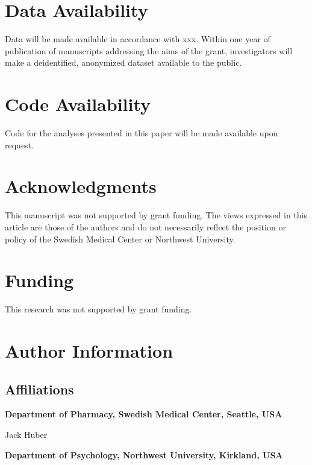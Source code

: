 \documentclass[
]{article}
\begin{document}
\hypertarget{data-availability}{%
\section{Data Availability}\label{data-availability}}

Data will be made available in accordance with xxx. Within one year of publication of manuscripts addressing the aims of the grant, investigators will make a deidentified, anonymized dataset available to the public.

\hypertarget{code-availability}{%
\section{Code Availability}\label{code-availability}}

Code for the analyses presented in this paper will be made available upon request.

\hypertarget{acknowledgments}{%
\section{Acknowledgments}\label{acknowledgments}}

This manuscript was not supported by grant funding. The views expressed in this article are those of the authors and do not necessarily reflect the position or policy of the Swedish Medical Center or Northwest University.

\hypertarget{funding}{%
\section{Funding}\label{funding}}

This research was not supported by grant funding.

\hypertarget{author-information}{%
\section{Author Information}\label{author-information}}

\hypertarget{affiliations}{%
\subsection{Affiliations}\label{affiliations}}

\textbf{Department of Pharmacy, Swedish Medical Center, Seattle, USA}

Jack Huber

\textbf{Department of Psychology, Northwest University, Kirkland, USA}
\end{document}
